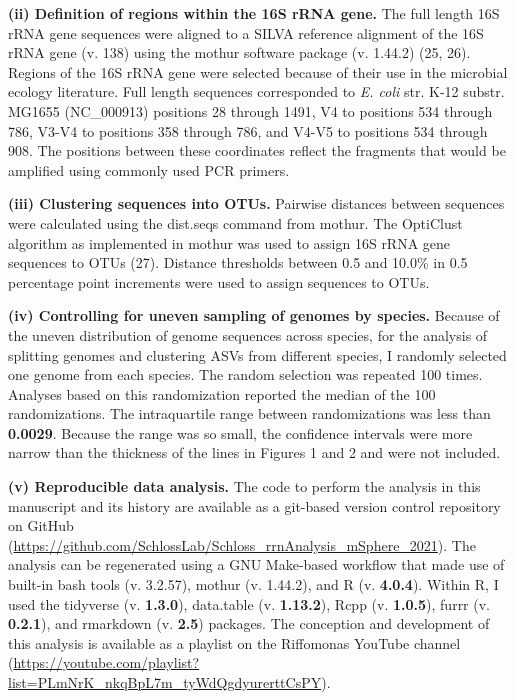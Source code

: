 \documentclass[
]{article}
\begin{document}
\textbf{(ii) Definition of regions within the 16S rRNA gene.} The full
length 16S rRNA gene sequences were aligned to a SILVA reference
alignment of the 16S rRNA gene (v. 138) using the mothur software
package (v. 1.44.2) (25, 26). Regions of the 16S rRNA gene were selected
because of their use in the microbial ecology literature. Full length
sequences corresponded to \emph{E. coli} str. K-12 substr. MG1655
(NC\_000913) positions 28 through 1491, V4 to positions 534 through 786,
V3-V4 to positions 358 through 786, and V4-V5 to positions 534 through
908. The positions between these coordinates reflect the fragments that
would be amplified using commonly used PCR primers.

\textbf{(iii) Clustering sequences into OTUs.} Pairwise distances
between sequences were calculated using the dist.seqs command from
mothur. The OptiClust algorithm as implemented in mothur was used to
assign 16S rRNA gene sequences to OTUs (27). Distance thresholds between
0.5 and 10.0\% in 0.5 percentage point increments were used to assign
sequences to OTUs.

\textbf{(iv) Controlling for uneven sampling of genomes by species.}
Because of the uneven distribution of genome sequences across species,
for the analysis of splitting genomes and clustering ASVs from different
species, I randomly selected one genome from each species. The random
selection was repeated 100 times. Analyses based on this randomization
reported the median of the 100 randomizations. The intraquartile range
between randomizations was less than \textbf{0.0029}. Because the range
was so small, the confidence intervals were more narrow than the
thickness of the lines in Figures 1 and 2 and were not included.

\textbf{(v) Reproducible data analysis.} The code to perform the
analysis in this manuscript and its history are available as a git-based
version control repository on GitHub
(\url{https://github.com/SchlossLab/Schloss_rrnAnalysis_mSphere_2021}).
The analysis can be regenerated using a GNU Make-based workflow that
made use of built-in bash tools (v. 3.2.57), mothur (v. 1.44.2), and R
(v. \textbf{4.0.4}). Within R, I used the tidyverse (v. \textbf{1.3.0}),
data.table (v. \textbf{1.13.2}), Rcpp (v. \textbf{1.0.5}), furrr (v.
\textbf{0.2.1}), and rmarkdown (v. \textbf{2.5}) packages. The
conception and development of this analysis is available as a playlist
on the Riffomonas YouTube channel
(\url{https://youtube.com/playlist?list=PLmNrK_nkqBpL7m_tyWdQgdyurerttCsPY}).
\end{document}
